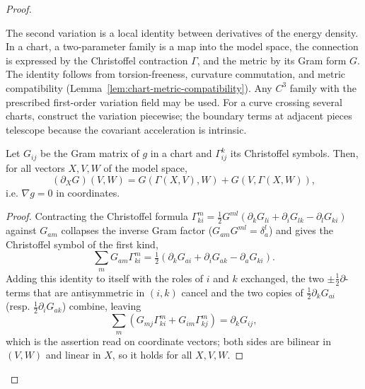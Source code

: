 \begin{proof}
\begin{remark}
\label{rem:second-variation-chart-route}


The second variation is a local identity between derivatives of the energy
density.  In a chart, a two-parameter family is a map into the model
space, the connection is expressed by the Christoffel contraction
$\Gamma$, and the metric by its Gram form $G$.  The identity follows from
torsion-freeness, curvature commutation, and metric compatibility
(Lemma~\ref{lem:chart-metric-compatibility}).  Any $C^3$ family with the
prescribed first-order variation field may be used.  For a curve crossing
several charts, construct the variation piecewise; the boundary terms at
adjacent pieces telescope because the covariant acceleration is intrinsic.
\end{remark}

\begin{lemma}
\label{lem:chart-metric-compatibility}





Let $G_{ij}$ be the Gram matrix of $g$ in a chart and $\Gamma^k_{ij}$ its
Christoffel symbols.  Then, for all vectors $X,V,W$ of the model space,
$$(\partial_X G)(V,W)=G(\Gamma(X,V),W)+G(V,\Gamma(X,W)),$$
i.e. $\nabla g=0$ in coordinates.
\end{lemma}

\begin{proof}
\sketch

Contracting the Christoffel formula
$\Gamma^m_{ki}=\tfrac12 G^{ml}(\partial_kG_{li}+\partial_iG_{lk}-\partial_lG_{ki})$
against $G_{am}$ collapses the inverse Gram factor ($G_{am}G^{ml}=\delta_a^l$) and
gives the Christoffel symbol of the first kind,
$$\textstyle\sum_m G_{am}\Gamma^m_{ki}
=\tfrac12\left(\partial_kG_{ai}+\partial_iG_{ak}-\partial_aG_{ki}\right).$$
Adding this identity to itself with the roles of $i$ and $k$ exchanged, the two
$\pm\tfrac12\partial$-terms that are antisymmetric in $(i,k)$ cancel and the two
copies of $\tfrac12\partial_kG_{ai}$ (resp. $\tfrac12\partial_iG_{ak}$) combine, leaving
$$\textstyle\sum_m\left(G_{mj}\Gamma^m_{ki}+G_{im}\Gamma^m_{kj}\right)=\partial_kG_{ij},$$
which is the assertion read on coordinate vectors; both sides are bilinear in
$(V,W)$ and linear in $X$, so it holds for all $X,V,W$.
\end{proof}

\begin{lemma}
\label{lem:second-variation-energy-chart}


\end{lemma}
\end{proof}
